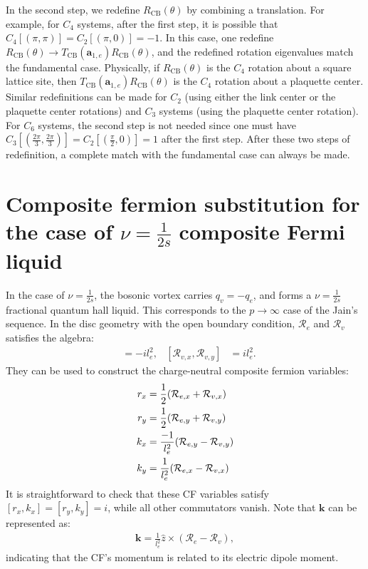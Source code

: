 \begin{subappendices}
In the second step, we redefine $R_{\text{CB}}(\theta)$ by combining a translation. For example, for $C_4$ systems, after the first step, it is possible that $C_4[(\pi,\pi)]=C_2[(\pi,0)]=-1$. In this case, one redefine $R_{\text{CB}}(\theta)\rightarrow T_{\text{CB}}(\mathbf a_{1,e})R_{\text{CB}}(\theta)$, and the redefined rotation eigenvalues match the fundamental case. Physically, if $R_{\text{CB}}(\theta)$ is the $C_4$ rotation about a square lattice site, then $T_{\text{CB}}(\mathbf a_{1,e})R_{\text{CB}}(\theta)$ is the $C_4$ rotation about a plaquette center. Similar redefinitions can be made for $C_2$ (using either the link center or the plaquette center rotations) and $C_3$ systems (using the plaquette center rotation). For $C_6$ systems, the second step is not needed since one must have $C_3[(\frac{2\pi}{3},\frac{2\pi}{3})]=C_2[(\frac{\pi}{2},0)]=1$ after the first step. After these two steps of redefinition, a complete match with the fundamental case can always be made.

\section{Composite fermion substitution for the case of $\nu=\frac{1}{2s}$ composite Fermi liquid}\label{app:CFL_substitution}
In the case of $\nu=\frac{1}{2s}$, the bosonic vortex carries $q_v=-q_e$, and forms a $\nu=\frac{1}{2s}$ fractional quantum hall liquid. This corresponds to the $p\rightarrow\infty$ case of the Jain's sequence. In the disc geometry with the open boundary condition, $\mathcal R_e$ and $\mathcal R_v$ satisfies the algebra:
\begin{align}
[\mathcal R_{e,x},\mathcal R_{e,y}]&=-il_e^2,&[\mathcal R_{v,x},\mathcal R_{v,y}]&=il_e^2.
\end{align}
They can be used to construct the charge-neutral composite fermion variables:
\begin{align}
r_x&=\frac{1}{2}(\mathcal R_{e,x}+\mathcal R_{v,x})\notag\\
r_y&=\frac{1}{2}(\mathcal R_{e,y}+\mathcal R_{v,y})\notag\\
k_x&=\frac{-1}{l_e^2}(\mathcal R_{e,y}-\mathcal R_{v,y})\notag\\
k_y&=\frac{1}{l_e^2}(\mathcal R_{e,x}-\mathcal R_{v,x})
\end{align}
It is straightforward to check that these CF variables satisfy $[r_x,k_x]=[r_y,k_y]=i$, while all other commutators vanish. Note that $\bm k$ can be represented as:
\begin{align}
\bm k=\frac{1}{l_e^2}\hat z\times(\mathcal R_e-\mathcal R_v),
\end{align}
indicating that the CF's momentum is related to its electric dipole moment.


\end{subappendices}
